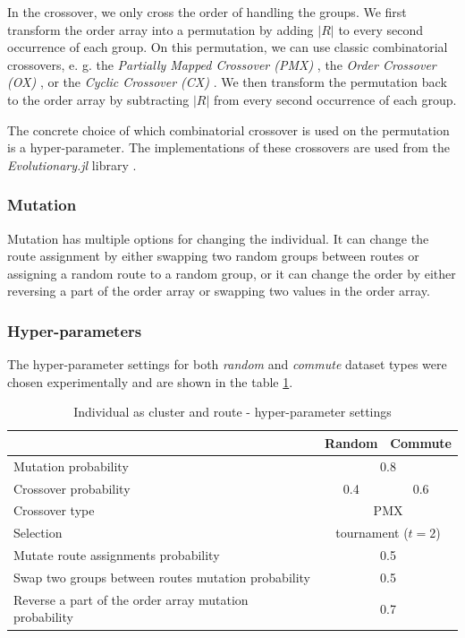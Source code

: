 In the crossover, we only cross the order of handling the groups. We first transform the order array into a permutation by adding $|R|$ to every second occurrence of each group. On this permutation, we can use classic combinatorial crossovers, e. g. the \textit{Partially Mapped Crossover (PMX)} \cite{Goldberg1985AllelesLA}, the \textit{Order Crossover (OX)} \cite{Davis1985ApplyingAA}, or the \textit{Cyclic Crossover (CX)} \cite{Oliver1987ASO}. We then transform the permutation back to the order array by subtracting $|R|$ from every second occurrence of each group.

The concrete choice of which combinatorial crossover is used on the permutation is a hyper-parameter. The implementations of these crossovers are used from the \textit{Evolutionary.jl} library \cite{art_2022_5851574}.

\subsubsection{Mutation}

Mutation has multiple options for changing the individual. It can change the route assignment by either swapping two random groups between routes or assigning a random route to a random group, or it can change the order by either reversing a part of the order array or swapping two values in the order array.

\subsubsection{Hyper-parameters}

The hyper-parameter settings for both \textit{random} and \textit{commute} dataset types were chosen experimentally and are shown in the table \ref{tab:evo_cr_hyperparams}.

\begin{table}[h]
    \centering
    \begin{tabular}{lcc}
         & Random & Commute \\
        \hline
        Mutation probability & \multicolumn{2}{c}{0.8} \\
        Crossover probability & 0.4 & 0.6 \\
        Crossover type & \multicolumn{2}{c}{PMX} \\
        Selection & \multicolumn{2}{c}{tournament ($t=2$)} \\
        Mutate route assignments probability & \multicolumn{2}{c}{0.5} \\
        Swap two groups between routes mutation probability & \multicolumn{2}{c}{0.5} \\
        Reverse a part of the order array mutation probability & \multicolumn{2}{c}{0.7} \\ 
    \end{tabular}
    \caption{Individual as cluster and route - hyper-parameter settings}
    \label{tab:evo_cr_hyperparams}
\end{table}

